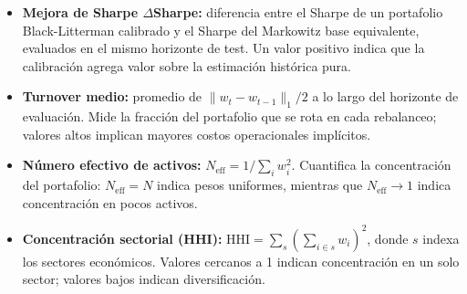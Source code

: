 \begin{itemize}
    \item \textbf{Mejora de Sharpe $\Delta$Sharpe:} diferencia entre el Sharpe
    de un portafolio Black-Litterman calibrado y el Sharpe del Markowitz base
    equivalente, evaluados en el mismo horizonte de test. Un valor positivo
    indica que la calibraci\'on agrega valor sobre la estimaci\'on hist\'orica
    pura.

    \item \textbf{Turnover medio:} promedio de $\|w_t - w_{t-1}\|_1 / 2$ a lo
    largo del horizonte de evaluaci\'on. Mide la fracci\'on del portafolio que
    se rota en cada rebalanceo; valores altos implican mayores costos
    operacionales impl\'icitos.

    \item \textbf{N\'umero efectivo de activos:}
    $N_{\text{eff}} = 1 / \sum_i w_i^2$. Cuantifica la concentraci\'on del
    portafolio: $N_{\text{eff}} = N$ indica pesos uniformes, mientras que
    $N_{\text{eff}} \to 1$ indica concentraci\'on en pocos activos.

    \item \textbf{Concentraci\'on sectorial (HHI):}
    $\text{HHI} = \sum_{s} \left(\sum_{i \in s} w_i\right)^2$,
    donde $s$ indexa los sectores econ\'omicos. Valores cercanos a 1 indican
    concentraci\'on en un solo sector; valores bajos indican diversificaci\'on.
\end{itemize}
